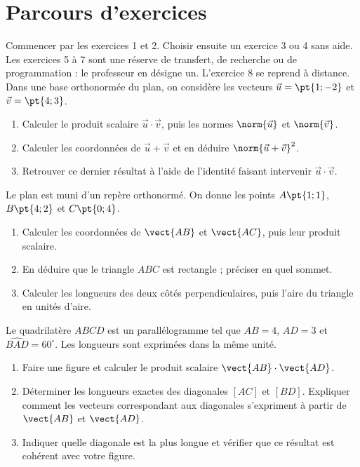 \section*{Parcours d’exercices}\label{C03-PARC}
Commencer par les exercices 1 et 2. Choisir ensuite un exercice 3 ou 4 sans aide. Les exercices 5 à 7 sont une réserve de transfert, de recherche ou de programmation : le professeur en désigne un. L’exercice 8 se reprend à distance.
\begingroup
{}
Dans une base orthonormée du plan, on considère les vecteurs $\vec u=\pt{1;-2}$ et $\vec v=\pt{4;3}$.
\begin{enumerate}[label=\arabic*.]
\item Calculer le produit scalaire $\vec u\cdot\vec v$, puis les normes $\norm{\vec u}$ et $\norm{\vec v}$.
\item Calculer les coordonnées de $\vec u+\vec v$ et en déduire $\norm{\vec u+\vec v}^2$.
\item Retrouver ce dernier résultat à l’aide de l’identité faisant intervenir $\vec u\cdot\vec v$.
\end{enumerate}
Le plan est muni d’un repère orthonormé. On donne les points $A\pt{1;1}$, $B\pt{4;2}$ et $C\pt{0;4}$.
\begin{enumerate}[label=\arabic*.]
\item Calculer les coordonnées de $\vect{AB}$ et $\vect{AC}$, puis leur produit scalaire.
\item En déduire que le triangle $ABC$ est rectangle ; préciser en quel sommet.
\item Calculer les longueurs des deux côtés perpendiculaires, puis l’aire du triangle en unités d’aire.
\end{enumerate}
Le quadrilatère $ABCD$ est un parallélogramme tel que $AB=4$, $AD=3$ et $\widehat{BAD}=60^\circ$. Les longueurs sont exprimées dans la même unité.
\begin{enumerate}[label=\arabic*.]
\item Faire une figure et calculer le produit scalaire $\vect{AB}\cdot\vect{AD}$.
\item Déterminer les longueurs exactes des diagonales $[AC]$ et $[BD]$. Expliquer comment les vecteurs correspondant aux diagonales s’expriment à partir de $\vect{AB}$ et $\vect{AD}$.
\item Indiquer quelle diagonale est la plus longue et vérifier que ce résultat est cohérent avec votre figure.
\end{enumerate}
